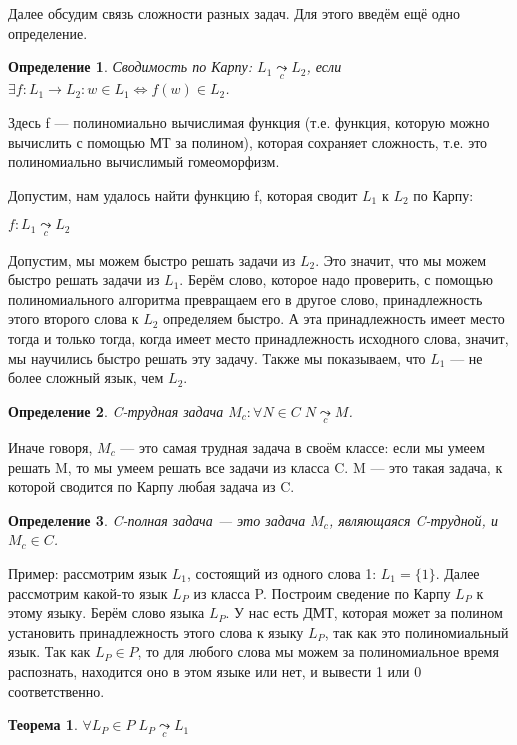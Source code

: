 \documentclass[a4paper]{article}
\newtheorem{theorem} {Теорема}
\newtheorem{definition}{Определение}
\begin{document}
{Далее обсудим связь сложности разных задач. Для этого введём ещё одно определение.

\begin{definition} Сводимость по Карпу: $L_1 \underset{c}{\leadsto} L_2$, если $\exists f: L_1 \rightarrow L_2: w \in L_1 \Leftrightarrow f(w) \in L_2$.
\end{definition}

Здесь f — полиномиально вычислимая функция (т.е. функция, которую можно вычислить с помощью МТ за полином), которая сохраняет сложность, т.е. это полиномиально вычислимый гомеоморфизм.

Допустим, нам удалось найти функцию f, которая сводит $L_1$ к $L_2$ по Карпу:

$f: L_1\underset{c}{\leadsto}L_2$

Допустим, мы можем быстро решать задачи из $L_2$. Это значит, что мы можем быстро решать задачи из $L_1$. Берём слово, которое надо проверить, с помощью полиномиального алгоритма превращаем его в другое слово, принадлежность этого второго слова к $L_2$ определяем быстро. А эта принадлежность имеет место тогда и только тогда, когда имеет место принадлежность исходного слова, значит, мы научились быстро решать эту задачу. Также мы показываем, что $L_1$ — не более сложный язык, чем $L_2$.
\begin{definition} C-трудная задача $M_c: \forall N \in C\;N \underset{c}{\leadsto}M$.
\end{definition}

Иначе говоря, $M_c$ — это самая трудная задача в своём классе: если мы умеем решать M, то мы умеем решать все задачи из класса C. M — это такая задача, к которой сводится по Карпу любая задача из C.

\begin{definition} C-полная задача — это задача $M_c$, являющаяся C-трудной, и $M_c \in C$.
\end{definition}

Пример: рассмотрим язык $L_1$, состоящий из одного слова 1: $L_1 = \{1\}$. Далее рассмотрим какой-то язык $L_P$ из класса P. Построим сведение по Карпу $L_P$ к этому языку. Берём слово языка $L_P$. У нас есть ДМТ, которая может за полином установить принадлежность этого слова к языку $L_P$, так как это полиномиальный язык. Так как $L_P \in P$, то для любого слова мы можем за полиномиальное время распознать, находится оно в этом языке или нет, и вывести 1 или 0 соответственно.

\begin{theorem} \textbf{$\forall L_P \in P\;L_P \underset{c}{\leadsto} L_1$} 
\end{theorem}

}
\end{document}
